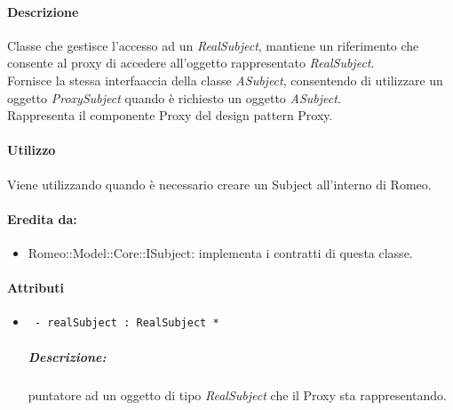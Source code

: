 \paragraph{Descrizione \\}
Classe che gestisce l’accesso ad un \textsl{RealSubject}, mantiene un riferimento che consente al proxy di accedere all’oggetto rappresentato \textsl{RealSubject}.
\\Fornisce la stessa interfaaccia della classe \textsl{ASubject}, consentendo di utilizzare un oggetto \textsl{ProxySubject} quando è richiesto un oggetto \textsl{ASubject}.
\\Rappresenta il componente Proxy del design pattern\g{} Proxy.

\paragraph{Utilizzo \\}
Viene utilizzando quando è necessario creare un Subject\g{} all'interno di Romeo\g{}.

\paragraph{Eredita da:}
\begin{itemize}
	\item Romeo::Model::Core::ISubject: implementa i contratti di questa classe.
\end{itemize}

\paragraph{Attributi \\}
	\begin{itemize}
		\item \color{teal}\verb! - realSubject : RealSubject *!
		\color{black}
		\subparagraph{Descrizione:} puntatore ad un oggetto di tipo \textsl{RealSubject} che il Proxy sta rappresentando.
	\end{itemize}

\color{black}
